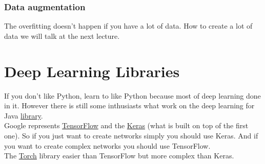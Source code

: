 \subsubsection*{Data augmentation}

The overfitting doesn't happen if you have a lot of data. How to create a lot of data we will talk at the next lecture.

\section{Deep Learning Libraries}

If you don't like Python, learn to like Python because most of deep learning done in it. However there is still some inthusiasts what work on the deep learning for Java \href{http://deeplearning4j.org/}{library}.\\
Google represents \href{www.tensorflow.org}{TensorFlow} and the \href{keras.io}{Keras} (what is built on top of the first one). So if you just want to create networks simply you should use Keras. And if you want to create complex networks you should use TensorFlow.\\
The \href{torch.ch}{Torch} library easier than TensorFlow but more complex than Keras.